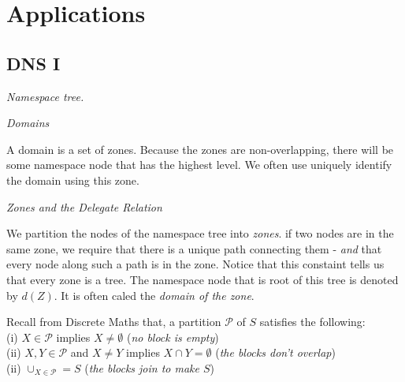 \chapter{Applications}


\section{DNS I}

\frmrule 

\textit{Namespace tree.}


\frmrule 

\textit{Domains}

A domain is a set of zones. 
Because the zones are non-overlapping, there will be some namespace node 
that has the highest level. 
We often use uniquely identify the domain using this zone. 


\frmrule 

\textit{Zones and the Delegate Relation}

We partition the nodes of the namespace tree into \textit{zones}. 
if two nodes are in the same zone, we require that there is a unique 
path connecting them - \textit{and} that every node along 
such a path is in the zone. Notice that this constaint tells 
us that every zone is a tree. 
The namespace node that is root of this tree is denoted by $d(Z)$. 
It is often caled the \textit{domain of the zone}. 



Recall from Discrete Maths that, a partition $\mathcal{P}$ of $S$ satisfies the following:\\
(i) $X \in \mathcal{P}$ implies $X \neq \emptyset$ (\textit{no block is empty})\\
(ii) $X,Y \in \mathcal{P}$ and $X \neq Y$ implies $X \cap Y = \emptyset$ (\textit{the blocks don't overlap})\\
(ii) $\cup_{X \in \mathcal{P}} = S$ (\textit{the blocks join to make $S$})\\


